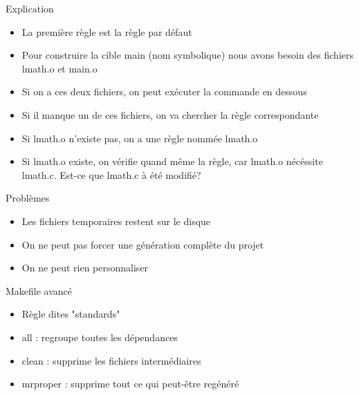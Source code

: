 \begin{frame}[containsverbatim]{\ftitle}
\def\blocktitle{Explication}
\begin{block}{\blocktitle}
\begin{itemize}
\item La première règle est la règle par défaut
\item Pour construire la cible main (nom symbolique) nous avons besoin des fichiers lmath.o et main.o
\item Si on a ces deux fichiers, on peut exécuter la commande en dessous
\item Si il manque un de ces fichiers, on va chercher la règle correspondante
\item Si lmath.o n'existe pas, on a une règle nommée lmath.o
\item Si lmath.o existe, on vérifie quand même la règle, car lmath.o nécéssite lmath.c. Est-ce que lmath.c à été modifié?
\end{itemize}
\end{block}
\end{frame}


\begin{frame}[containsverbatim]{\ftitle}
\def\blocktitle{Problèmes}
\begin{block}{\blocktitle}
\begin{itemize}
\item Les fichiers temporaires restent sur le disque
\item On ne peut pas forcer une génération complète du projet
\item On ne peut rien personnaliser
\end{itemize}
\end{block}


\def\blocktitle{Makefile avancé}
\begin{block}{\blocktitle}
\begin{itemize}
\item Règle dites "standards"
\item all : regroupe toutes les dépendances
\item clean : supprime les fichiers intermédiaires
\item mrproper : supprime tout ce qui peut-être regénéré
\end{itemize}
\end{block}
\end{frame}


